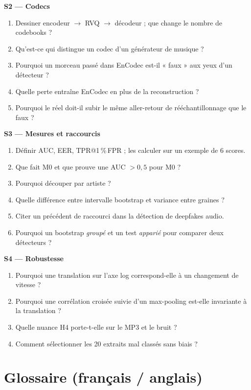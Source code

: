 \documentclass[11pt,a4paper]{article}
\makeatletter
\newcommand{\tprfpr}{TPR@1\,\%\,FPR}
\makeatother
\begin{document}
\textbf{S2 --- Codecs}
\begin{enumerate}
  \item Dessiner encodeur $\rightarrow$ RVQ $\rightarrow$ décodeur ; que change le nombre de codebooks ?
  \item Qu'est-ce qui distingue un codec d'un générateur de musique ?
  \item Pourquoi un morceau passé dans EnCodec est-il « faux » aux yeux d'un détecteur ?
  \item Quelle perte entraîne EnCodec en plus de la reconstruction ?
  \item Pourquoi le réel doit-il subir le même aller-retour de rééchantillonnage que le faux ?
\end{enumerate}

\textbf{S3 --- Mesures et raccourcis}
\begin{enumerate}
  \item Définir AUC, EER, \tprfpr{} ; les calculer sur un exemple de 6 scores.
  \item Que fait M0 et que prouve une AUC $>0{,}5$ pour M0 ?
  \item Pourquoi découper par artiste ?
  \item Quelle différence entre intervalle bootstrap et variance entre graines ?
  \item Citer un précédent de raccourci dans la détection de deepfakes audio.
  \item Pourquoi un bootstrap \emph{groupé} et un test \emph{apparié} pour comparer deux détecteurs ?
\end{enumerate}

\textbf{S4 --- Robustesse}
\begin{enumerate}
  \item Pourquoi une translation sur l'axe log correspond-elle à un changement de vitesse ?
  \item Pourquoi une corrélation croisée suivie d'un max-pooling est-elle invariante à la translation ?
  \item Quelle nuance H4 porte-t-elle sur le MP3 et le bruit ?
  \item Comment sélectionner les 20 extraits mal classés sans biais ?
\end{enumerate}

\section{Glossaire (français / anglais)}
\label{app:glossaire}
\end{document}
